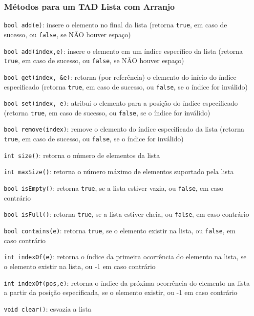 \documentclass[aspectratio=169]{beamer}
\begin{document}
\begin{frame}\frametitle{Métodos para um TAD Lista com Arranjo}
\begin{itemize}
{\scriptsize
	\item \texttt{bool add(e)}: insere o elemento no final da lista (retorna \texttt{true}, em caso de sucesso, ou \texttt{false}, se NÃO houver espaço)
	\item \texttt{bool add(index,e)}: insere o elemento em um índice específico da lista (retorna \texttt{true}, em caso de sucesso, ou \texttt{false}, se NÃO houver espaço)
	\item \texttt{bool get(index, \&e)}: retorna (por referência) o elemento do início do índice especificado (retorna \texttt{true}, em caso de sucesso, ou \texttt{false}, se o índice for inválido)
	\item \texttt{bool set(index, e)}: atribui o elemento para a posição do índice especificado (retorna \texttt{true}, em caso de sucesso, ou \texttt{false}, se o índice for inválido)
	\item \texttt{bool remove(index)}: remove o elemento do índice especificado da lista (retorna \texttt{true}, em caso de sucesso, ou \texttt{false}, se o índice for inválido)
	\item \texttt{int size()}: retorna o número de elementos da lista\\
	\item \texttt{int maxSize()}: retorna o número máximo de elementos suportado pela lista\\
	\item \texttt{bool isEmpty()}: retorna \texttt{true}, se a lista estiver vazia, ou \texttt{false}, em caso contrário\\
	\item \texttt{bool isFull()}: retorna \texttt{true}, se a lista estiver cheia, ou \texttt{false}, em caso contrário\\
	\item \texttt{bool contains(e)}: retorna \texttt{true}, se o elemento existir na lista, ou \texttt{false},  em caso contrário\\
	\item \texttt{int indexOf(e)}: retorna o índice da primeira ocorrência do elemento na lista, se o elemento existir na lista, ou -1 em caso contrário\\
	\item \texttt{int indexOf(pos,e)}: retorna o índice da próxima ocorrência do elemento na lista a partir da posição especificada, se o elemento existir, ou -1 em caso contrário\\
	\item \texttt{void clear()}: esvazia a lista\\
}
\end{itemize}
\end{frame}
\end{document}
